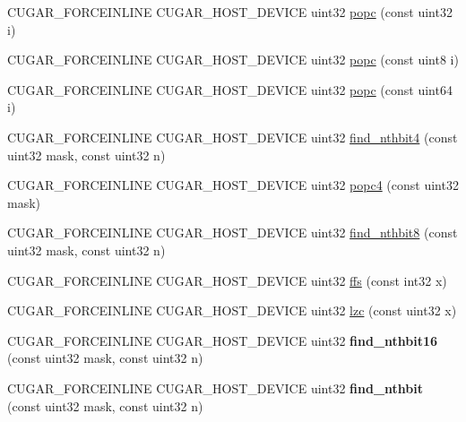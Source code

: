 \begin{DoxyCompactItemize}
\item 
C\+U\+G\+A\+R\+\_\+\+F\+O\+R\+C\+E\+I\+N\+L\+I\+NE C\+U\+G\+A\+R\+\_\+\+H\+O\+S\+T\+\_\+\+D\+E\+V\+I\+CE uint32 \hyperlink{group___bits_module_gac8ac259ac805ab9499212e88829c6723}{popc} (const uint32 i)
\item 
C\+U\+G\+A\+R\+\_\+\+F\+O\+R\+C\+E\+I\+N\+L\+I\+NE C\+U\+G\+A\+R\+\_\+\+H\+O\+S\+T\+\_\+\+D\+E\+V\+I\+CE uint32 \hyperlink{group___bits_module_ga073933cb13ac2d78195d52f59b3460a7}{popc} (const uint8 i)
\item 
C\+U\+G\+A\+R\+\_\+\+F\+O\+R\+C\+E\+I\+N\+L\+I\+NE C\+U\+G\+A\+R\+\_\+\+H\+O\+S\+T\+\_\+\+D\+E\+V\+I\+CE uint32 \hyperlink{group___bits_module_ga64c0867f55f331496bc7617303b9e650}{popc} (const uint64 i)
\item 
C\+U\+G\+A\+R\+\_\+\+F\+O\+R\+C\+E\+I\+N\+L\+I\+NE C\+U\+G\+A\+R\+\_\+\+H\+O\+S\+T\+\_\+\+D\+E\+V\+I\+CE uint32 \hyperlink{group___bits_module_ga7f02d582847e11ea8454216ad36dc77b}{find\+\_\+nthbit4} (const uint32 mask, const uint32 n)
\item 
C\+U\+G\+A\+R\+\_\+\+F\+O\+R\+C\+E\+I\+N\+L\+I\+NE C\+U\+G\+A\+R\+\_\+\+H\+O\+S\+T\+\_\+\+D\+E\+V\+I\+CE uint32 \hyperlink{group___bits_module_ga4bc7fb7acba5b770553c58bfae69f5af}{popc4} (const uint32 mask)
\item 
C\+U\+G\+A\+R\+\_\+\+F\+O\+R\+C\+E\+I\+N\+L\+I\+NE C\+U\+G\+A\+R\+\_\+\+H\+O\+S\+T\+\_\+\+D\+E\+V\+I\+CE uint32 \hyperlink{group___bits_module_ga38b135612da4fe8202152a56dc9b9508}{find\+\_\+nthbit8} (const uint32 mask, const uint32 n)
\item 
C\+U\+G\+A\+R\+\_\+\+F\+O\+R\+C\+E\+I\+N\+L\+I\+NE C\+U\+G\+A\+R\+\_\+\+H\+O\+S\+T\+\_\+\+D\+E\+V\+I\+CE uint32 \hyperlink{group___bits_module_ga68f09d26fa95c119a5263f856365db42}{ffs} (const int32 x)
\item 
C\+U\+G\+A\+R\+\_\+\+F\+O\+R\+C\+E\+I\+N\+L\+I\+NE C\+U\+G\+A\+R\+\_\+\+H\+O\+S\+T\+\_\+\+D\+E\+V\+I\+CE uint32 \hyperlink{group___bits_module_gad2be8d91a93a10a6a9601f4f89bf752b}{lzc} (const uint32 x)
\item 
\mbox{\label{namespacecugar_aadc6c5ce0e035316f4c563c884aae302}} 
C\+U\+G\+A\+R\+\_\+\+F\+O\+R\+C\+E\+I\+N\+L\+I\+NE C\+U\+G\+A\+R\+\_\+\+H\+O\+S\+T\+\_\+\+D\+E\+V\+I\+CE uint32 {\bfseries find\+\_\+nthbit16} (const uint32 mask, const uint32 n)
\item 
\mbox{\label{namespacecugar_aee92b8a03dc75ebbd928df74704b451e}} 
C\+U\+G\+A\+R\+\_\+\+F\+O\+R\+C\+E\+I\+N\+L\+I\+NE C\+U\+G\+A\+R\+\_\+\+H\+O\+S\+T\+\_\+\+D\+E\+V\+I\+CE uint32 {\bfseries find\+\_\+nthbit} (const uint32 mask, const uint32 n)

\end{DoxyCompactItemize}
